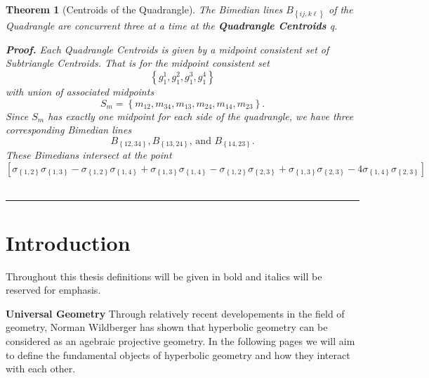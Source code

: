 \documentclass{unswthesis}
\newtheorem{theorem}{Theorem}
\newenvironment{proof}[1][Proof]{\noindent\textbf{#1.} }{\ \rule{0.5em}{0.5em}}
\begin{document}
\begin{theorem}[Centroids of the Quadrangle]
The Bimedian lines $B_{\left\{ ij,k\ell \right\} }$ of the Quadrangle are
concurrent three at a time at the \textbf{Quadrangle Centroids }q.

\begin{proof}
Each Quadrangle Centroids is given by a midpoint consistent set of
Subtriangle Centroids. That is for the midpoint consistent set 
\begin{equation*}
\left\{ g_{1}^{1},g_{1}^{2},g_{1}^{3},g_{1}^{4}\right\} 
\end{equation*}%
with union of associated midpoints%
\begin{equation*}
S_{m}=\left\{ m_{12},m_{34},m_{13},m_{24},m_{14},m_{23}\right\} .
\end{equation*}%
Since $S_{m}$ has exactly one midpoint for each side of the quadrangle, we
have three corresponding Bimedian lines 
\begin{equation*}
B_{\left\{ 12,34\right\} },B_{\left\{ 13,24\right\} }\text{, and }B_{\left\{
14,23\right\} }\text{.}
\end{equation*}%
These Bimedians intersect at the point%
\begin{equation*}
\left[ \sigma _{\left\{ 1,2\right\} }\sigma _{\left\{ 1,3\right\} }-\sigma
_{\left\{ 1,2\right\} }\sigma _{\left\{ 1,4\right\} }+\sigma _{\left\{
1,3\right\} }\sigma _{\left\{ 1,4\right\} }-\sigma _{\left\{ 1,2\right\}
}\sigma _{\left\{ 2,3\right\} }+\sigma _{\left\{ 1,3\right\} }\sigma
_{\left\{ 2,3\right\} }-4\sigma _{\left\{ 1,4\right\} }\sigma _{\left\{
2,3\right\} }\right] 
\end{equation*}
\end{proof}
\end{theorem}

\bigskip \pagebreak

\chapter{\protect\bigskip Introduction}

Throughout this thesis definitions will be given in bold and italics will be
reserved for emphasis.\newline

\textbf{Universal Geometry} Through relatively recent developements in the
field of geometry, Norman Wildberger has shown that hyperbolic geometry can
be considered as an agebraic projective geometry. In the following pages we
will aim to define the fundamental objects of hyperbolic geometry and how
they interact with each other.\newline
\end{document}
